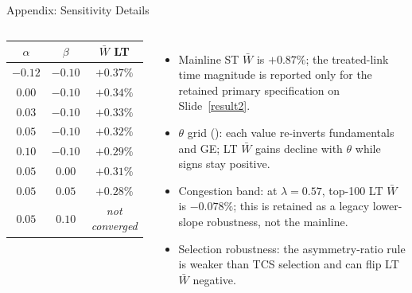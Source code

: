 \documentclass[11pt,aspectratio=169]{beamer}
\newcommand{\app}[1]{\allowbreak\hspace{0.25em}\hyperlink{#1}{\beamergotobutton{details}}}
\newcommand{\navback}[1]{\par\vspace{0.35em}\noindent\hfill\hyperlink{#1}{\beamerreturnbutton{back}}}
\begin{document}
\begin{frame}[label=appsensdetail]{Appendix: Sensitivity Details}
\scriptsize
\begin{columns}[T,onlytextwidth]
\begin{flushright}
\setlength{\tabcolsep}{4pt}
\begin{tabular}{ccc}
\toprule
$\alpha$ & $\beta$ & $\bar W$ LT \\
\midrule
$-0.12$ & $-0.10$ & $+0.37\%$ \\
$0.00$ & $-0.10$ & $+0.34\%$ \\
$0.03$ & $-0.10$ & $+0.33\%$ \\
$\mathbf{0.05}$ & $\mathbf{-0.10}$ & $\mathbf{+0.32\%}$ \\
$0.10$ & $-0.10$ & $+0.29\%$ \\
$0.05$ & $0.00$ & $+0.31\%$ \\
$0.05$ & $0.05$ & $+0.28\%$ \\
$0.05$ & $0.10$ & \emph{not converged} \\
\bottomrule
\end{tabular}
\end{flushright}
\begin{itemize}\footnotesize
  \item Mainline ST $\bar W$ is $+0.87\%$; the treated-link time magnitude is reported only for the retained primary specification on Slide~\ref{result2}.
  \item $\theta$ grid (\app{appsens_theta}): each value re-inverts fundamentals and GE; LT $\bar W$ gains decline with $\theta$ while signs stay positive.
  \item Congestion band: at $\lambda=0.57$, top-100 LT $\bar W$ is $-0.078\%$; this is retained as a legacy lower-slope robustness, not the mainline.
  \item Selection robustness: the asymmetry-ratio rule is weaker than TCS selection and can flip LT $\bar W$ negative.
\end{itemize}
\end{columns}
\navback{appsens}
\end{frame}
\end{document}
